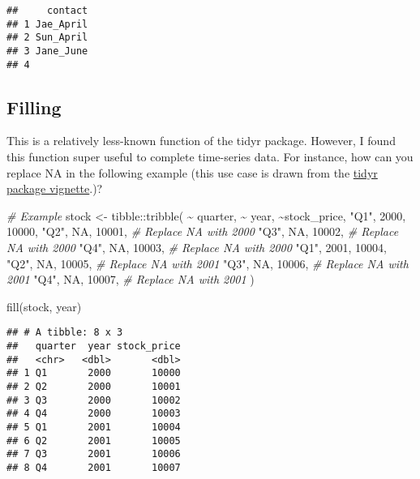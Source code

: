 \documentclass[
]{book}
\newenvironment{Shaded}{\begin{snugshade}}{\end{snugshade}}
\newcommand{\CommentTok}[1]{\textcolor[rgb]{0.56,0.35,0.01}{\textit{#1}}}
\newcommand{\ConstantTok}[1]{\textcolor[rgb]{0.00,0.00,0.00}{#1}}
\newcommand{\DecValTok}[1]{\textcolor[rgb]{0.00,0.00,0.81}{#1}}
\newcommand{\FunctionTok}[1]{\textcolor[rgb]{0.00,0.00,0.00}{#1}}
\newcommand{\NormalTok}[1]{#1}
\newcommand{\OtherTok}[1]{\textcolor[rgb]{0.56,0.35,0.01}{#1}}
\newcommand{\SpecialCharTok}[1]{\textcolor[rgb]{0.00,0.00,0.00}{#1}}
\newcommand{\StringTok}[1]{\textcolor[rgb]{0.31,0.60,0.02}{#1}}
\begin{document}
\begin{verbatim}
##     contact
## 1 Jae_April
## 2 Sun_April
## 3 Jane_June
## 4
\end{verbatim}

\hypertarget{filling}{%
\subsection{Filling}\label{filling}}

This is a relatively less-known function of the tidyr package. However, I found this function super useful to complete time-series data. For instance, how can you replace NA in the following example (this use case is drawn from the \href{https://tidyr.tidyverse.org/reference/fill.html}{tidyr package vignette}.)?

\begin{Shaded}
\begin{Highlighting}[]
\CommentTok{\# Example }
\NormalTok{stock }\OtherTok{\textless{}{-}}\NormalTok{ tibble}\SpecialCharTok{::}\FunctionTok{tribble}\NormalTok{(}
  \SpecialCharTok{\textasciitilde{}}\NormalTok{ quarter, }\SpecialCharTok{\textasciitilde{}}\NormalTok{ year, }\SpecialCharTok{\textasciitilde{}}\NormalTok{stock\_price, }
  \StringTok{"Q1"}\NormalTok{, }\DecValTok{2000}\NormalTok{, }\DecValTok{10000}\NormalTok{, }
  \StringTok{"Q2"}\NormalTok{, }\ConstantTok{NA}\NormalTok{, }\DecValTok{10001}\NormalTok{, }\CommentTok{\# Replace NA with 2000  }
  \StringTok{"Q3"}\NormalTok{, }\ConstantTok{NA}\NormalTok{, }\DecValTok{10002}\NormalTok{, }\CommentTok{\# Replace NA with 2000 }
  \StringTok{"Q4"}\NormalTok{, }\ConstantTok{NA}\NormalTok{, }\DecValTok{10003}\NormalTok{, }\CommentTok{\# Replace NA with 2000 }
  \StringTok{"Q1"}\NormalTok{, }\DecValTok{2001}\NormalTok{, }\DecValTok{10004}\NormalTok{, }
  \StringTok{"Q2"}\NormalTok{, }\ConstantTok{NA}\NormalTok{, }\DecValTok{10005}\NormalTok{, }\CommentTok{\# Replace NA with 2001 }
  \StringTok{"Q3"}\NormalTok{, }\ConstantTok{NA}\NormalTok{, }\DecValTok{10006}\NormalTok{, }\CommentTok{\# Replace NA with 2001 }
  \StringTok{"Q4"}\NormalTok{, }\ConstantTok{NA}\NormalTok{, }\DecValTok{10007}\NormalTok{, }\CommentTok{\# Replace NA with 2001}
\NormalTok{)}

\FunctionTok{fill}\NormalTok{(stock, year)}
\end{Highlighting}
\end{Shaded}

\begin{verbatim}
## # A tibble: 8 x 3
##   quarter  year stock_price
##   <chr>   <dbl>       <dbl>
## 1 Q1       2000       10000
## 2 Q2       2000       10001
## 3 Q3       2000       10002
## 4 Q4       2000       10003
## 5 Q1       2001       10004
## 6 Q2       2001       10005
## 7 Q3       2001       10006
## 8 Q4       2001       10007
\end{verbatim}
\end{document}

